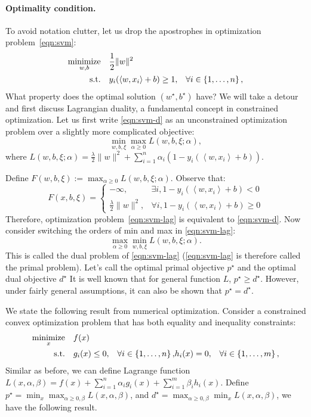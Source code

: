 \documentclass{article}
\DeclareMathOperator*{\minimize}{{\rm minimize}}
\DeclareMathOperator*{\st}{{\rm s.t.}}
\newcommand{\inner}[2]{\left\langle #1,#2 \right\rangle}
\begin{document}
\paragraph{Optimality condition.} To avoid notation clutter, let us drop the apostrophes in optimization problem~\eqref{eqn:svm}:
\begin{align}
  \minimize_{w,b} \quad & \frac12 \| w \|^2 & \label{eqn:svm-d} \\
    \st \quad &  y_i(\inner{w}{x_i} + b) \geq 1, &\forall i \in \cbr{1,\ldots,n}, \nonumber
\end{align}
What property does the optimal solution $(w^\star, b^\star)$ have? We will take a detour and first discuss Lagrangian duality, a fundamental concept in constrained optimization. Let us first write \eqref{eqn:svm-d} as an unconstrained optimization problem over a slightly more complicated objective:
\begin{equation}
   \min_{w,b,\xi} \max_{\alpha \geq 0} L(w,b,\xi;\alpha),
   \label{eqn:svm-lag}
\end{equation}
where $L(w,b,\xi;\alpha) = \frac \lambda 2 \| w \|^2 + \sum_{i=1}^n \alpha_i (1 - y_i(\inner{w}{x_i} + b))$.

Define $F(w,b,\xi) := \max_{\alpha \geq 0} L(w,b,\xi;\alpha)$. Observe that:
\[
F(x,b,\xi) =
\begin{cases}
-\infty, & \exists i, 1 - y_i(\inner{w}{x_i} + b) < 0 \\
\frac \lambda 2 \| w \|^2, & \forall i, 1 - y_i(\inner{w}{x_i} + b) \geq 0
\end{cases}
\]
Therefore, optimization problem~\eqref{eqn:svm-lag} is equivalent to \eqref{eqn:svm-d}. Now consider switching the orders of min and max in \eqref{eqn:svm-lag}:
\[ \max_{\alpha \geq 0} \min_{w,b,\xi} L(w,b,\xi;\alpha). \]
This is called the dual problem of \eqref{eqn:svm-lag} (\eqref{eqn:svm-lag} is therefore called the primal problem). Let's call the optimal primal objective $p^\star$ and the optimal dual objective $d^\star$
It is well known that for general function $L$, $p^\star \geq d^\star$. However,
under fairly general assumptions, it can also be shown that $p^\star = d^\star$.

We state the following result from numerical optimization. Consider a constrained convex optimization problem that has both equality and inequality constraints:
\begin{align}
  \minimize_{x} \quad & f(x) & \nonumber \\
    \st \quad & g_i(x) \leq 0, &\forall i \in \cbr{1,\ldots,n}, \nonumber
              & h_i(x) = 0, &\forall i \in \cbr{1,\ldots,m}, \nonumber
\end{align}
Similar as before, we can define Lagrange function $L(x,\alpha,\beta) = f(x) + \sum_{i=1}^n \alpha_i g_i(x) + \sum_{i=1}^m \beta_i h_i(x)$. Define
$p^\star = \min_x \max_{\alpha \geq 0, \beta} L(x,\alpha,\beta)$, and $d^\star = \max_{\alpha \geq 0, \beta} \min_x L(x,\alpha,\beta)$, we have the following result.
\end{document}

